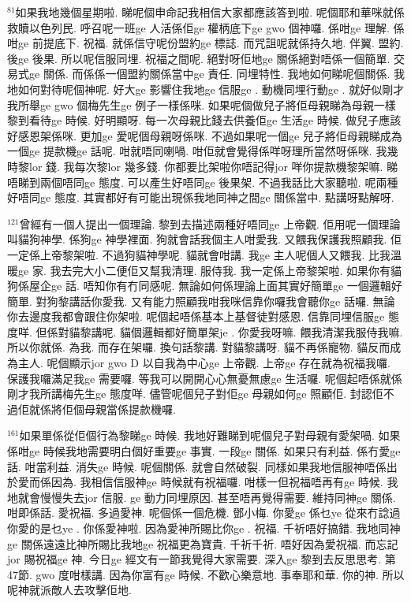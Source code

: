 \documentclass{book}
\begin{document}
$^{81}$如果我地幾個星期啦.
睇呢個申命記我相信大家都應該答到啦.
呢個耶和華咪就係救贖以色列民.
呼召呢一班ge 人活係佢ge 權柄底下ge gwo 個神囉.
係咁ge 理解.
係咁ge 前提底下.
祝福.
就係信守呢份盟約ge 標誌.
而咒詛呢就係持久地.
伴翼.
盟約.
後ge 後果.
所以呢信服同埋.
祝福之間呢.
絕對呀佢地ge 關係絕對唔係一個簡單.
交易式ge 關係.
而係係一個盟約關係當中ge 責任.
同埋特性.
我地如何睇呢個關係.
我地如何對待呢個神呢.
好大ge 影響住我地ge 信服ge .
動機同埋行動ge .
就好似剛才我所舉ge gwo 個梅先生ge 例子一樣係咪.
如果呢個做兒子將佢母親睇為母親一樣黎到看待ge 時候.
好明顯呀.
每一次母親比錢去供養佢ge 生活ge 時候.
做兒子應該好感恩架係咪.
更加ge 愛呢個母親呀係咪.
不過如果呢一個ge 兒子將佢母親睇成為一個ge 提款機ge 話呢.
咁就唔同喇喎.
咁佢就會覺得係咩呀理所當然呀係咪.
我幾時黎lor 錢.
我每次黎lor 幾多錢.
你都要比架啦你唔記得jor 咩你提款機黎架嘛.
睇唔睇到兩個唔同ge 態度.
可以產生好唔同ge 後果架.
不過我話比大家聽啦.
呢兩種好唔同ge 態度.
其實都好有可能出現係我地同神之間ge 關係當中.
點講呀點解呀.

$^{121}$曾經有一個人提出一個理論.
黎到去描述兩種好唔同ge 上帝觀.
佢用呢一個理論叫貓狗神學.
係狗ge 神學裡面.
狗就會話我個主人咁愛我.
又餵我保護我照顧我.
佢一定係上帝黎架啦.
不過狗貓神學呢.
貓就會咁講.
我ge 主人呢個人又餵我.
比我溫暖ge 家.
我去完大小二便佢又幫我清理.
服侍我.
我一定係上帝黎架啦.
如果你有貓狗係屋企ge 話.
唔知你有冇同感呢.
無論如何係理論上面其實好簡單ge 一個邏輯好簡單.
對狗黎講話你愛我.
又有能力照顧我咁我咪信靠你囉我會聽你ge 話囉.
無論你去邊度我都會跟住你架啦.
呢個起唔係基本上基督徒對感恩.
信靠同埋信服ge 態度咩.
但係對貓黎講呢.
貓個邏輯都好簡單架je .
你愛我呀嘛.
餵我清潔我服侍我嘛.
所以你就係.
為我.
而存在架囉.
換句話黎講.
對貓黎講呀.
貓不再係寵物.
貓反而成為主人.
呢個顯示jor gwo D 以自我為中心ge 上帝觀.
上帝ge 存在就為祝福我囉.
保護我囉滿足我ge 需要囉.
等我可以開開心心無憂無慮ge 生活囉.
呢個起唔係就係剛才我所講梅先生ge 態度咩.
儘管呢個兒子對佢ge 母親如何ge 照顧佢.
封認佢不過佢就係將佢個母親當係提款機囉.

$^{161}$如果單係從佢個行為黎睇ge 時候.
我地好難睇到呢個兒子對母親有愛架喎.
如果係咁ge 時候我地需要明白個好重要ge 事實.
一段ge 關係.
如果只有利益.
係冇愛ge 話.
咁當利益.
消失ge 時候.
呢個關係.
就會自然破裂.
同樣如果我地信服神唔係出於愛而係因為.
我相信信服神ge 時候就有祝福囉.
咁樣一但祝福唔再有ge 時候.
我地就會慢慢失去jor 信服.
ge 動力同埋原因.
甚至唔再覺得需要.
維持同神ge 關係.
咁即係話.
愛祝福.
多過愛神.
呢個係一個危機.
鄧小梅.
你愛ge 係乜ye 從來冇諗過你愛的是乜ye .
你係愛神啦.
因為愛神所賜比你ge .
祝福.
千祈唔好搞錯.
我地同神ge 關係遠遠比神所賜比我地ge 祝福更為寶貴.
千祈千祈.
唔好因為愛祝福.
而忘記jor 賜祝福ge 神.
今日ge 經文有一節我覺得大家需要.
深入ge 黎到去反思思考.
第47節.
gwo 度咁樣講.
因為你富有ge 時候.
不歡心樂意地.
事奉耶和華.
你的神.
所以呢神就派敵人去攻擊佢地.
\end{document}
